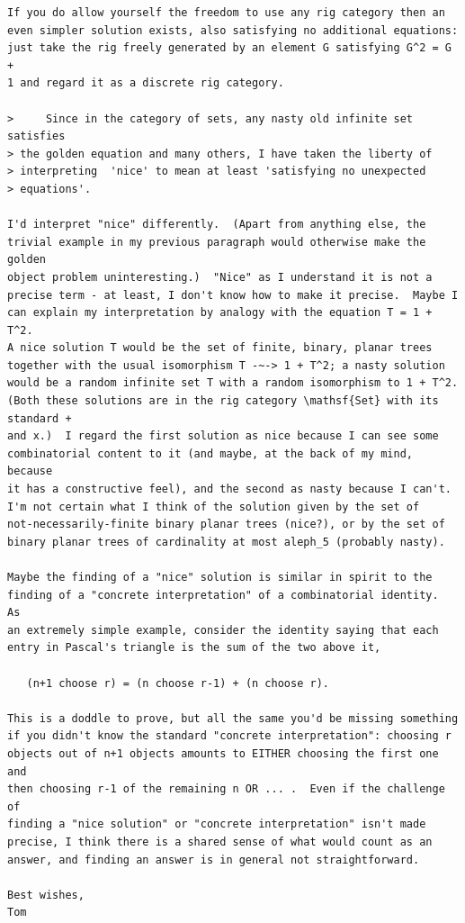 \documentclass{article}
\begin{document}
\begin{verbatim}
If you do allow yourself the freedom to use any rig category then an
even simpler solution exists, also satisfying no additional equations:
just take the rig freely generated by an element G satisfying G^2 = G +
1 and regard it as a discrete rig category.

>     Since in the category of sets, any nasty old infinite set satisfies
> the golden equation and many others, I have taken the liberty of
> interpreting  'nice' to mean at least 'satisfying no unexpected
> equations'.

I'd interpret "nice" differently.  (Apart from anything else, the
trivial example in my previous paragraph would otherwise make the golden
object problem uninteresting.)  "Nice" as I understand it is not a
precise term - at least, I don't know how to make it precise.  Maybe I
can explain my interpretation by analogy with the equation T = 1 + T^2. 
A nice solution T would be the set of finite, binary, planar trees
together with the usual isomorphism T -~-> 1 + T^2; a nasty solution
would be a random infinite set T with a random isomorphism to 1 + T^2. 
(Both these solutions are in the rig category \mathsf{Set} with its standard +
and x.)  I regard the first solution as nice because I can see some
combinatorial content to it (and maybe, at the back of my mind, because
it has a constructive feel), and the second as nasty because I can't. 
I'm not certain what I think of the solution given by the set of
not-necessarily-finite binary planar trees (nice?), or by the set of
binary planar trees of cardinality at most aleph_5 (probably nasty).

Maybe the finding of a "nice" solution is similar in spirit to the
finding of a "concrete interpretation" of a combinatorial identity.  As
an extremely simple example, consider the identity saying that each
entry in Pascal's triangle is the sum of the two above it,

   (n+1 choose r) = (n choose r-1) + (n choose r).

This is a doddle to prove, but all the same you'd be missing something
if you didn't know the standard "concrete interpretation": choosing r
objects out of n+1 objects amounts to EITHER choosing the first one and
then choosing r-1 of the remaining n OR ... .  Even if the challenge of
finding a "nice solution" or "concrete interpretation" isn't made
precise, I think there is a shared sense of what would count as an
answer, and finding an answer is in general not straightforward.

Best wishes,
Tom






\end{verbatim}
\end{document}

